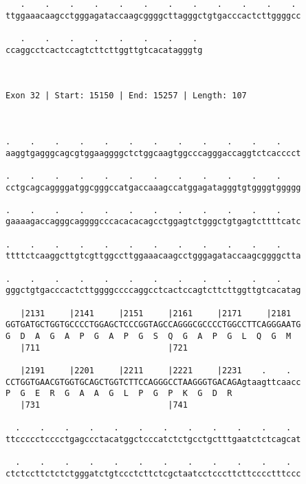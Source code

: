 \documentclass{article}
\begin{document}
\begin{Verbatim}
   .    .    .    .    .    .    .    .    .    .    .    . 
ttggaaacaagcctgggagataccaagcggggcttagggctgtgacccactcttggggcc
                                                            
   .    .    .    .    .    .    .    . 
ccaggcctcactccagtcttcttggttgtcacatagggtg
                                        
                                        
 
Exon 32 | Start: 15150 | End: 15257 | Length: 107



.    .    .    .    .    .    .    .    .    .    .    .    
aaggtgagggcagcgtggaaggggctctggcaagtggcccagggaccaggtctcacccct
                                                            
.    .    .    .    .    .    .    .    .    .    .    .    
cctgcagcaggggatggcgggccatgaccaaagccatggagatagggtgtggggtggggg
                                                            
.    .    .    .    .    .    .    .    .    .    .    .    
gaaaagaccagggcaggggcccacacacagcctggagtctgggctgtgagtcttttcatc
                                                            
.    .    .    .    .    .    .    .    .    .    .    .    
ttttctcaaggcttgtcgttggccttggaaacaagcctgggagataccaagcggggctta
                                                            
.    .    .    .    .    .    .    .    .    .    .    .    
gggctgtgacccactcttggggccccaggcctcactccagtcttcttggttgtcacatag
                                                            
   |2131     |2141     |2151     |2161     |2171     |2181  
GGTGATGCTGGTGCCCCTGGAGCTCCCGGTAGCCAGGGCGCCCCTGGCCTTCAGGGAATG
G  D  A  G  A  P  G  A  P  G  S  Q  G  A  P  G  L  Q  G  M  
   |711                          |721                       
  
   |2191     |2201     |2211     |2221     |2231    .    .  
CCTGGTGAACGTGGTGCAGCTGGTCTTCCAGGGCCTAAGGGTGACAGAgtaagttcaacc
P  G  E  R  G  A  A  G  L  P  G  P  K  G  D  R              
   |731                          |741                       
  
  .    .    .    .    .    .    .    .    .    .    .    .  
ttccccctcccctgagccctacatggctcccatctctgcctgctttgaatctctcagcat
                                                            
  .    .    .    .    .    .    .    .    .    .    .    .  
ctctccttctctctgggatctgtccctcttctcgctaatcctcccttcttcccctttccc
                                                            

\end{Verbatim}
\end{document}
